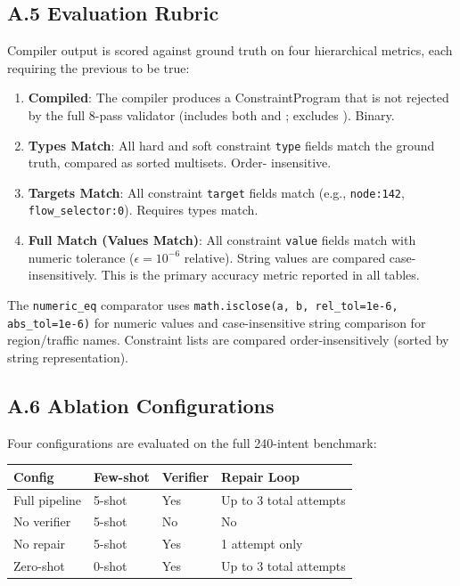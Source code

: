 \subsection*{A.5 Evaluation Rubric}

Compiler output is scored against ground truth on four hierarchical
metrics, each requiring the previous to be true:

\begin{enumerate}
\item \textbf{Compiled}: The compiler produces a ConstraintProgram that
is not rejected by the full 8-pass validator (includes both
 and ; excludes ).
Binary.

\item \textbf{Types Match}: All hard and soft constraint \texttt{type}
fields match the ground truth, compared as sorted multisets. Order-
insensitive.

\item \textbf{Targets Match}: All constraint \texttt{target} fields
match (e.g., \texttt{node:142}, \texttt{flow\_selector:0}). Requires
types match.

\item \textbf{Full Match (Values Match)}: All constraint \texttt{value}
fields match with numeric tolerance ($\epsilon = 10^{-6}$ relative).
String values are compared case-insensitively. This is the primary
accuracy metric reported in all tables.
\end{enumerate}

\noindent The \texttt{numeric\_eq} comparator uses
\texttt{math.isclose(a, b, rel\_tol=1e-6, abs\_tol=1e-6)} for numeric
values and case-insensitive string comparison for region/traffic names.
Constraint lists are compared order-insensitively (sorted by string
representation).

\subsection*{A.6 Ablation Configurations}

Four configurations are evaluated on the full 240-intent benchmark:

\begin{table}[h]
\centering
\small
\begin{tabular}{llll}
\toprule
\textbf{Config} & \textbf{Few-shot} & \textbf{Verifier} & \textbf{Repair Loop} \\
\midrule
Full pipeline & 5-shot & Yes & Up to 3 total attempts \\
No verifier & 5-shot & No & No \\
No repair & 5-shot & Yes & 1 attempt only \\
Zero-shot & 0-shot & Yes & Up to 3 total attempts \\
\bottomrule
\end{tabular}
\end{table}

